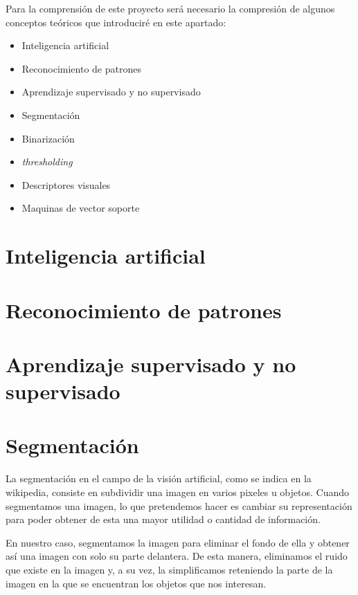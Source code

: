 

Para la comprensión de este proyecto será necesario la compresión de algunos conceptos teóricos que introduciré en este apartado:

\begin{itemize}
	\item Inteligencia artificial
	\item Reconocimiento de patrones
	\item Aprendizaje supervisado y no supervisado
	\item Segmentación
	\item Binarización
	\item \textit{thresholding}
	\item Descriptores visuales
	\item Maquinas de vector soporte
\end{itemize}


\section{Inteligencia artificial}

\section{Reconocimiento de patrones}

\section{Aprendizaje supervisado y no supervisado}

\section{Segmentación}

La segmentación en el campo de la visión artificial, como se indica en la wikipedia, consiste en subdividir una imagen en varios pixeles u objetos. \cite{wiki:segmentation}
Cuando segmentamos una imagen, lo que pretendemos hacer es cambiar su representación para poder obtener de esta una mayor utilidad o cantidad de información.

En nuestro caso, segmentamos la imagen para eliminar el fondo de ella y obtener así una imagen con solo su parte delantera. De esta manera, eliminamos el ruido que existe en la imagen y, a su vez, la simplificamos reteniendo la parte de la imagen en la que se encuentran los objetos que nos interesan.

